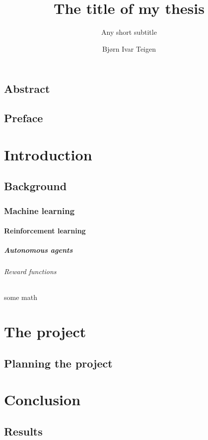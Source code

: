 \documentclass[UKenglish]{ifimaster}  %
\title{The title of my thesis}        %
\subtitle{Any short subtitle}         %
\author{Bjørn Ivar Teigen}                      %
\begin{document}
\duoforside[dept={Department of Informatics},   %
  program={Robotics and intelligent systems},  %
  long]                                        %

\frontmatter{}

\chapter*{Abstract}                   %

\tableofcontents{}
\listoffigures{}
\listoftables{}

\chapter*{Preface}                    %

\mainmatter{}
\part{Introduction}                   %

\chapter{Background}                  %
\section{Machine learning}
\subsection{Reinforcement learning}
\subsubsection{Autonomous agents}
\paragraph{Reward functions}
\subparagraph{some math}

\part{The project}                    %

\chapter{Planning the project}        %


\part{Conclusion}                     %

\chapter{Results}                     %


\backmatter{}
\printbibliography
\end{document}
